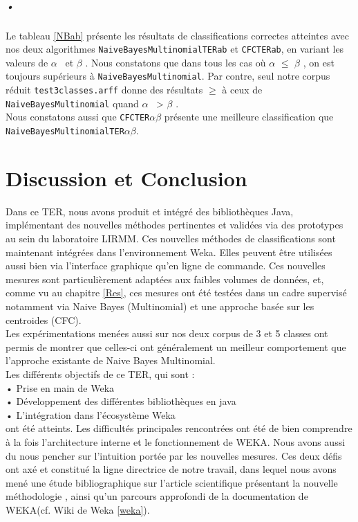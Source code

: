 \documentclass{article}
\begin{document}
\subparagraph*{•}
Le tableau \ref{NBab} présente les résultats de classifications correctes atteintes avec nos deux algorithmes \texttt{NaiveBayesMultinomialTERab} et \texttt{CFCTERab}, en variant les valeurs de $\alpha$  \ et $\beta$ . Nous constatons que dans tous les cas où $\alpha$ $ \leq$ $\beta$ , on est toujours supérieurs à  \texttt{NaiveBayesMultinomial}.   Par contre, seul notre corpus réduit \texttt{test3classes.arff} donne des résultats $\geq$ à ceux de \texttt{NaiveBayesMultinomial} quand $\alpha$ \ > $\beta$ .\\
Nous constatons aussi que \texttt{CFCTER$\alpha$$\beta$} présente une meilleure classification que \texttt{NaiveBayesMultinomialTER$\alpha$$\beta$}.




\section{Discussion et Conclusion }
Dans ce TER, nous avons produit et intégré des bibliothèques Java, implémentant des nouvelles méthodes pertinentes et validées via des prototypes au sein du laboratoire LIRMM. Ces nouvelles méthodes de classifications sont maintenant intégrées dans l'environnement Weka.
Elles peuvent être utilisées aussi bien via l'interface graphique qu'en ligne de commande. Ces nouvelles mesures sont particulièrement adaptées aux faibles volumes de données, et, comme vu au chapitre \ref{Res}, ces mesures ont été testées dans un cadre supervisé notamment via Naive Bayes (Multinomial) et une approche basée sur les centroides (CFC). \\
Les expérimentations menées aussi sur nos deux corpus de 3 et 5 classes ont permis de montrer que celles-ci ont généralement un meilleur comportement que l'approche existante de Naive Bayes Multinomial.\\
Les différents objectifs de ce TER, qui sont :\\
• Prise en main de Weka \\
• Développement des différentes bibliothèques en java \\
• L'intégration dans l’écosystème Weka \\
ont été atteints. Les difficultés principales rencontrées ont été de bien comprendre à la fois l'architecture interne et le fonctionnement de WEKA. Nous avons aussi du nous pencher sur l'intuition portée par les nouvelles mesures. Ces deux défis ont axé et constitué la ligne directrice de notre travail, dans lequel nous avons mené une étude bibliographique sur l'article scientifique présentant la nouvelle méthodologie \cite{RNTIB}, ainsi qu'un parcours approfondi de la documentation de WEKA(cf. Wiki de Weka \ref{weka}).
\end{document}

